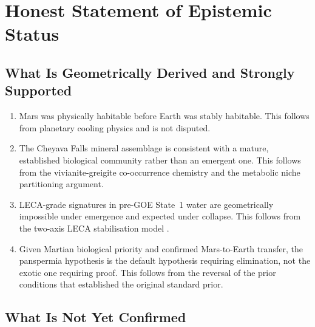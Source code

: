 \documentclass[11pt, a4paper]{article}
\begin{document}
\section{Honest Statement of Epistemic Status}

\subsection{What Is Geometrically Derived and
Strongly Supported}

\begin{enumerate}[leftmargin=*, label=(\arabic*)]
\item Mars was physically habitable before
  Earth was stably habitable.
  This follows from planetary cooling physics
  and is not disputed.

\item The Cheyava Falls mineral assemblage
  is consistent with a mature, established
  biological community rather than an
  emergent one.
  This follows from the vivianite-greigite
  co-occurrence chemistry and the
  metabolic niche partitioning argument.

\item LECA-grade signatures in pre-GOE
  State~1 water are geometrically
  impossible under emergence and
  expected under collapse.
  This follows from the two-axis
  LECA stabilisation model
  \cite{marspreregistration}.

\item Given Martian biological priority
  and confirmed Mars-to-Earth transfer,
  the panspermia hypothesis is the
  default hypothesis requiring
  elimination, not the exotic one
  requiring proof.
  This follows from the reversal of
  the prior conditions that established
  the original standard prior.
\end{enumerate}

\subsection{What Is Not Yet Confirmed}
\end{document}

